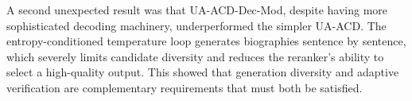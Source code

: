 \documentclass[11pt]{article}
\begin{document}
A second unexpected result was that UA-ACD-Dec-Mod, despite having more sophisticated decoding machinery, underperformed the simpler UA-ACD. The entropy-conditioned temperature loop generates biographies sentence by sentence, which severely limits candidate diversity and
reduces the reranker's ability to select a high-quality output. This showed that generation diversity and adaptive verification are complementary requirements that must both be satisfied.

%

\end{document}
